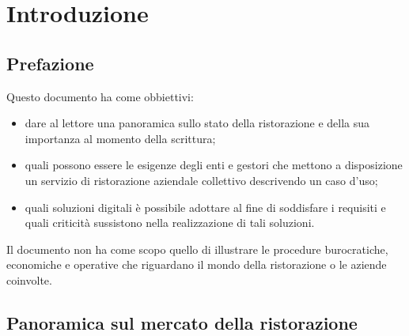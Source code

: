 \documentclass[a4paper, titlepage, 12pt, openright, oneside]{book}
\begin{document}
\begin{frontespizio}
\end{frontespizio}

\tableofcontents

\chapter{Introduzione}\label{chap:introduzione}

\section{Prefazione}

Questo documento ha come obbiettivi:
\begin{itemize}
	\item dare al lettore una panoramica sullo stato della ristorazione e della sua importanza al momento della scrittura;
	\item quali possono essere le esigenze degli enti e gestori che mettono a disposizione un servizio di ristorazione aziendale collettivo descrivendo un caso d'uso;
	\item quali soluzioni digitali è possibile adottare al fine di soddisfare i requisiti e quali criticità sussistono nella realizzazione di tali soluzioni.
\end{itemize}

Il documento non ha come scopo quello di illustrare le procedure burocratiche, economiche e operative che riguardano il mondo della ristorazione o le aziende coinvolte.

\section{Panoramica sul mercato della ristorazione}
\end{document}
